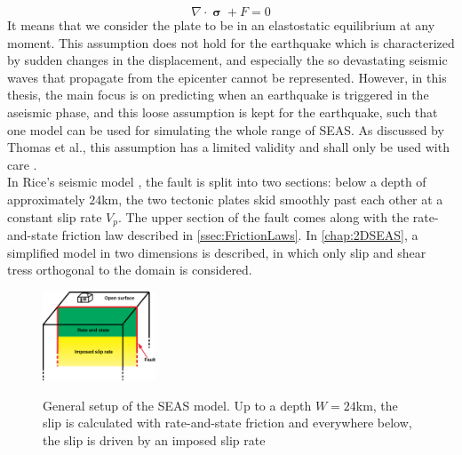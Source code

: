 \begin{equation}
\label{eq:GeneralElastostaticProblem}
\nabla \cdot \bm{\upsigma} + F = 0
\end{equation}
It means that we consider the plate to be in an elastostatic equilibrium at any moment. This assumption does not hold for the earthquake which is characterized by sudden changes in the displacement, and especially the so devastating seismic waves that propagate from the epicenter cannot be represented. However, in this thesis, the main focus is on predicting when an earthquake is triggered in the aseismic phase, and this loose assumption is kept for the earthquake, such that one model can be used for simulating the whole range of SEAS. As discussed by Thomas et al., this assumption has a limited validity and shall only be used with care \cite{IsQuasiElastostaticGoodEnough}. \\

In Rice's seismic model \cite{MechanicsOfEarthquakeRupture}, the fault is split into two sections: below a depth of approximately $24$km, the two tectonic plates skid smoothly past each other at a constant slip rate $V_p$. The upper section of the fault comes along with the rate-and-state friction law described in \autoref{ssec:FrictionLaws}. In \autoref{chap:2DSEAS}, a simplified model in two dimensions is described, in which only slip and shear tress orthogonal to the domain is considered. 

\begin{figure}[H]
	\centering
	\includegraphics[width=0.3\textwidth]{images/generalSEASModel.png}
	\label{fig:general3DSEASModel}
	\caption{General setup of the SEAS model. Up to a depth $W=24$km, the slip is calculated with rate-and-state friction and everywhere below, the slip is driven by an imposed slip rate}
\end{figure}

